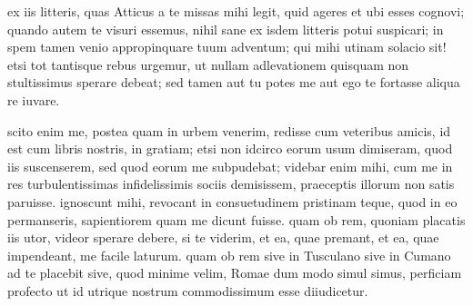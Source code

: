 


 ex iis litteris, quas Atticus a te missas mihi legit, quid ageres et ubi esses cognovi; quando autem te visuri essemus, nihil sane ex isdem litteris potui suspicari; in spem tamen venio appropinquare tuum adventum; qui mihi utinam solacio sit! etsi tot tantisque rebus urgemur, ut nullam adlevationem quisquam non stultissimus sperare debeat; sed tamen aut tu potes me aut ego te fortasse aliqua re iuvare.

 scito enim me, postea quam in urbem venerim, redisse cum veteribus amicis, id est cum libris nostris, in gratiam; etsi non idcirco eorum usum dimiseram, quod iis suscenserem, sed quod eorum me subpudebat; videbar enim mihi, cum me in res turbulentissimas infidelissimis sociis demisissem, praeceptis illorum non satis paruisse. ignoscunt mihi, revocant in consuetudinem pristinam teque, quod in eo permanseris, sapientiorem quam me dicunt fuisse. quam ob rem, quoniam placatis iis utor, videor sperare debere, si te viderim, et ea, quae premant, et ea, quae impendeant, me facile laturum. quam ob rem sive in Tusculano sive in Cumano ad te placebit sive, quod minime velim, Romae dum modo simul simus, perficiam profecto ut id utrique nostrum commodissimum esse diiudicetur.

